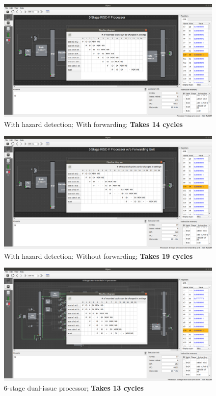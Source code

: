 \documentclass[12pt, fleqn]{article}
\begin{document}
\subsection{}
\begin{figure}[H]
  \centering
  \includegraphics[scale=0.22]{Q3/hf_pipeline.png}
  \caption{With hazard detection; With forwarding; \textbf{Takes 14 cycles}}
\end{figure}
\begin{figure}[H]
  \centering
  \includegraphics[scale=0.22]{Q3/hnf_pipeline.png}
  \caption{With hazard detection; Without forwarding; \textbf{Takes 19 cycles}}
\end{figure}
\begin{figure}[H]
  \centering
  \includegraphics[scale=0.22]{Q3/6di_pipeline.png}
  \caption{6-stage dual-issue processor; \textbf{Takes 13 cycles}}
\end{figure}
\end{document}
